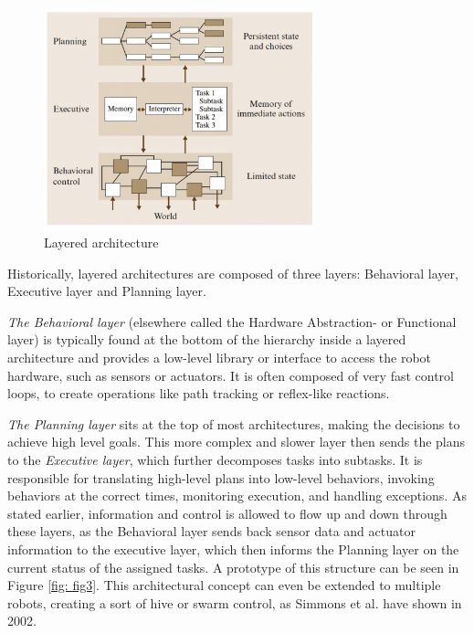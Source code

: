 \documentclass[]{article}
\begin{document}
	\begin{figure}[ht]
		\centering
		\includegraphics[width=0.7\textwidth]{Graphics/LayeredArchitecture}
		\caption{Layered architecture \autocite{brooksRobustLayeredControl1986}}
		\label{fig: fig2}
	\end{figure}
	
	Historically, layered architectures are composed of three layers: Behavioral layer, Executive layer and Planning layer. \autocite{jun-youngjungThreelayeredHybridArchitecture2008,peterbonassoExperiencesArchitectureIntelligent1997}
	
	\textit{The Behavioral layer} (elsewhere called the Hardware Abstraction-  or Functional layer) is typically found at the bottom of the hierarchy inside a layered architecture and provides a low-level library or interface to access the robot hardware, such as sensors or actuators. \autocite{jun-youngjungThreelayeredHybridArchitecture2008,simmonsLayeredArchitectureCoordination2002} It is often composed of very fast control loops, to create operations like path tracking or reflex-like reactions. \autocite{schillingAutonomeSystemeUnd2023} 
	
	\textit{The Planning layer} sits at the top of most architectures, making the decisions to achieve high level goals. This more complex and slower layer then sends the plans to the \textit{Executive layer}, which further decomposes tasks into subtasks. It is responsible for translating high-level plans into low-level behaviors, invoking behaviors at the correct times, monitoring execution, and handling exceptions. \autocite{schillingAutonomeSystemeUnd2023,simmonsLayeredArchitectureCoordination2002,volpeCLARAtyArchitectureRobotic2001} 
	As stated earlier, information and control is allowed to flow up and down through these layers, as the Behavioral layer sends back sensor data and actuator  information to the executive layer, which then informs the Planning layer on the current status of the assigned tasks. \autocite{jun-youngjungThreelayeredHybridArchitecture2008} A prototype of this structure can be seen in Figure \ref{fig: fig3}. 
	This architectural concept can even be extended to multiple robots, creating a sort of hive or swarm control, as Simmons et al. have shown in 2002. \autocite{simmonsLayeredArchitectureCoordination2002}
	
\end{document}
